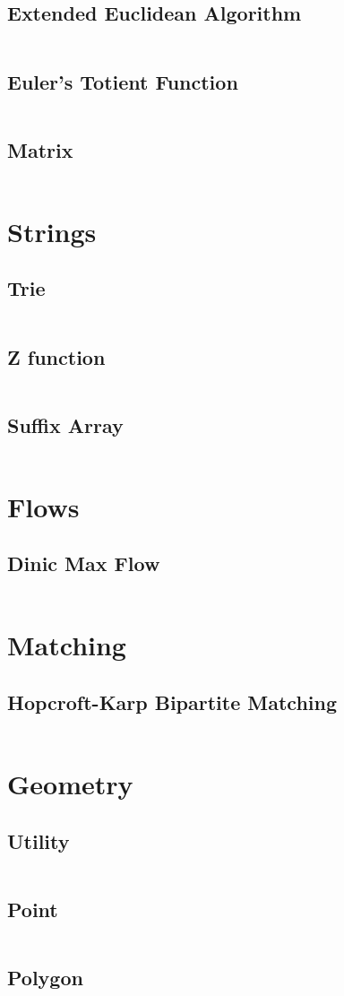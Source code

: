   \subsection{Extended Euclidean Algorithm}
    \inputminted{cpp}{library/maths/extended_euclidean.hpp}
  \subsection{Euler's Totient Function}
    \inputminted{cpp}{library/maths/euler_phi.hpp}
  \subsection{Matrix}
    \inputminted{cpp}{library/maths/matrix.hpp}

\section{Strings}
  \subsection{Trie}
    \inputminted{cpp}{library/strings/trie.hpp}
  \subsection{Z function}
    \inputminted{cpp}{library/strings/z_function.hpp}
  \subsection{Suffix Array}
    \inputminted{cpp}{library/strings/suffix_array.hpp}

\section{Flows}
  \subsection{Dinic Max Flow}
    \inputminted{cpp}{library/flows/dinic.hpp}

\section{Matching}
  \subsection{Hopcroft-Karp Bipartite Matching}
    \inputminted{cpp}{library/matching/hopcroft_karp.hpp}

\section{Geometry}
  \subsection{Utility}
    \inputminted{cpp}{library/geo/geoutil.hpp}
  \subsection{Point}
    \inputminted{cpp}{library/geo/point.hpp}
  \subsection{Polygon}
    \inputminted{cpp}{library/geo/polygon.hpp}